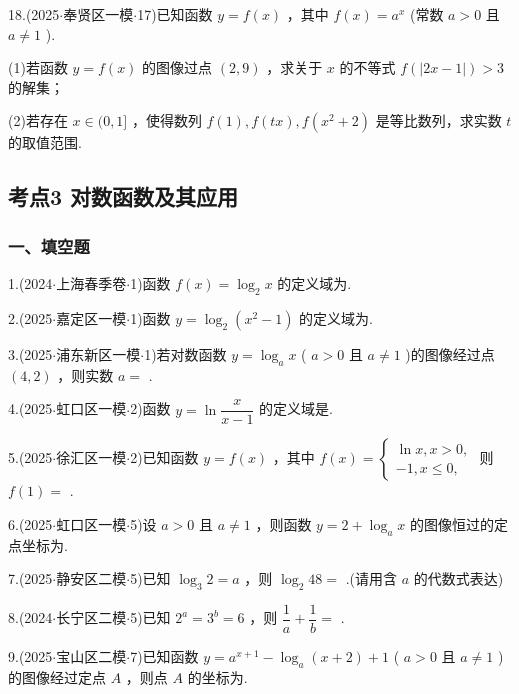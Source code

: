 18.(2025$\cdot$奉贤区一模$\cdot$17)已知函数 $y = f\left( x\right)$ ，其中 $f\left( x\right)  = {a}^{x}$ (常数 $a > 0$ 且 $a \neq  1$ ).

(1)若函数 $y = f\left( x\right)$ 的图像过点 $\left( {2,9}\right)$ ，求关于 $x$ 的不等式 $f\left( \left| {{2x} - 1}\right| \right)  > 3$ 的解集；

(2)若存在 $x \in  (0,1\rbrack$ ，使得数列 $f\left( 1\right) ,f\left( {tx}\right) ,f\left( {{x}^{2} + 2}\right)$ 是等比数列，求实数 $t$ 的取值范围.

\subsection*{考点3 对数函数及其应用}

\subsubsection*{一、填空题}

1.(2024$\cdot$上海春季卷$\cdot$1)函数 $f\left( x\right)  = {\log }_{2}x$ 的定义域为\blkda[2]{}.

2.(2025$\cdot$嘉定区一模$\cdot$1)函数 $y = {\log }_{2}\left( {{x}^{2} - 1}\right)$ 的定义域为\blkda[2]{}.

3.(2025$\cdot$浦东新区一模$\cdot$1)若对数函数 $y = {\log }_{a}x$ ( $a > 0$ 且 $a \neq  1$ )的图像经过点 $\left( {4,2}\right)$ ，则实数 $a =$ \blkda[2]{}.

4.(2025$\cdot$虹口区一模$\cdot$2)函数 $y = \ln \dfrac{x}{x - 1}$ 的定义域是\blkda[2]{}.

5.(2025$\cdot$徐汇区一模$\cdot$2)已知函数 $y = f\left( x\right)$ ，其中 $f\left( x\right)  = \left\{  \begin{array}{l} \ln x,x > 0, \\   - 1,x \leq  0, \end{array}\right.$ 则 $f\left( 1\right)  =$ \blkda[2]{}.

6.(2025$\cdot$虹口区一模$\cdot$5)设 $a > 0$ 且 $a \neq  1$ ，则函数 $y = 2 + {\log }_{a}x$ 的图像恒过的定点坐标为\blkda[2]{}.

7.(2025$\cdot$静安区二模$\cdot$5)已知 ${\log }_{3}2 = a$ ，则 ${\log }_{2}{48} =$ \blkda[2]{}.(请用含 $a$ 的代数式表达)

8.(2024$\cdot$长宁区二模$\cdot$5)已知 ${2}^{a} = {3}^{b} = 6$ ，则 $\dfrac{1}{a} + \dfrac{1}{b} =$ \blkda[2]{}.

9.(2025$\cdot$宝山区二模$\cdot$7)已知函数 $y = {a}^{x + 1} - {\log }_{a}\left( {x + 2}\right)  + 1$ ( $a > 0$ 且 $a \neq  1$ )的图像经过定点 $A$ ，则点 $A$ 的坐标为\blkda[2]{}.

